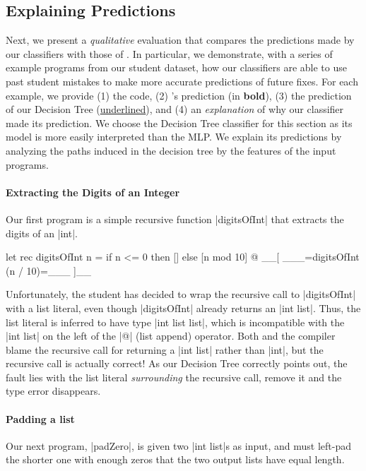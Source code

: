 \subsection{Explaining Predictions}
\label{sec:qualitative}

Next, we present a \emph{qualitative} evaluation that compares the
predictions made by our classifiers with those of \sherrloc.
%
In particular, we demonstrate, with a series of example programs from
our student dataset, how our classifiers are able to use past student
mistakes to make more accurate predictions of future fixes.
%
For each example, we provide
%
(1) the code,
%
(2) \sherrloc's prediction (in \textbf{bold}),
%
(3) the prediction of our Decision Tree (\underline{underlined}), and
%
(4) an \emph{explanation} of why our classifier made its prediction.
%
We choose the Decision Tree classifier for this section as its model
is more easily interpreted than the MLP. We explain its predictions by
analyzing the paths induced in the decision tree by the features of the
input programs.
%

\paragraph{Extracting the Digits of an Integer}
Our first program is a simple recursive function |digitsOfInt| that
extracts the digits of an |int|.
%
\begin{ecode}
  let rec digitsOfInt n =
    if n <= 0 then
      []
    else
      [n mod 10] @ __[ ___=digitsOfInt (n / 10)=___ ]__
\end{ecode}
%
Unfortunately, the student has decided to wrap the recursive call to
|digitsOfInt| with a list literal, even though |digitsOfInt| already
returns an |int list|.
%
Thus, the list literal is inferred to have type |int list list|, which
is incompatible with the |int list| on the left of the |@| (list append)
operator.
%
Both \sherrloc and the \ocaml compiler blame the recursive call for
returning a |int list| rather than |int|, but the recursive call is
actually correct!
%
As our Decision Tree correctly points out, the fault lies with the list
literal \emph{surrounding} the recursive call, remove it and the type
error disappears.
%

\paragraph{Padding a list}
Our next program, |padZero|, is given two |int list|s as input, and must
left-pad the shorter one with enough zeros that the two output lists
have equal length.

